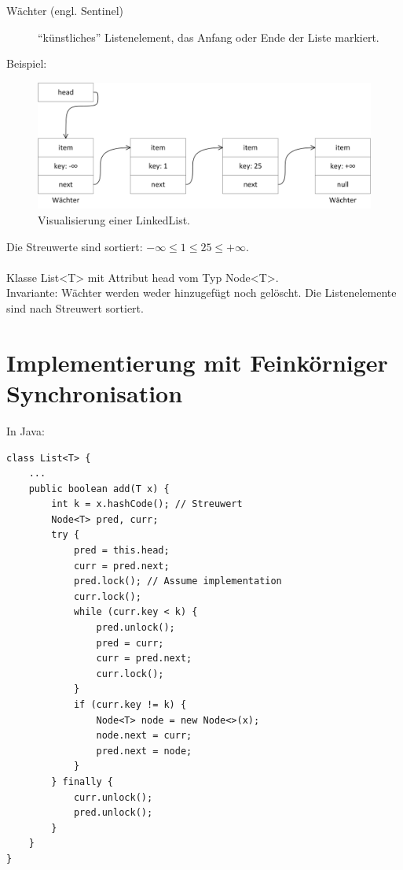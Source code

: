 \begin{description}
	\item[Wächter (engl. Sentinel)] "`künstliches"' Listenelement, das Anfang oder Ende der Liste markiert.
\end{description}

Beispiel:
\begin{figure}[H]
	\begin{center}
		\includegraphics[width=\textwidth]{res/linkedlist}
		\caption{Visualisierung einer LinkedList.}
		\label{pic:linkedlist}
	\end{center}
\end{figure} 
Die Streuwerte sind sortiert: $ -\infty \leq 1 \leq 25 \leq +\infty $.\\
\\
Klasse List<T> mit Attribut head vom Typ Node<T>.\\
Invariante: Wächter werden weder hinzugefügt noch gelöscht. Die Listenelemente sind nach Streuwert sortiert.

\section{Implementierung mit Feinkörniger Synchronisation}
In Java:
\begin{lstlisting}
class List<T> {
	...
	public boolean add(T x) {
		int k = x.hashCode(); // Streuwert
		Node<T> pred, curr;
		try {
			pred = this.head;
			curr = pred.next;
			pred.lock(); // Assume implementation
			curr.lock();
			while (curr.key < k) {
				pred.unlock();
				pred = curr;
				curr = pred.next;
				curr.lock();
			}
			if (curr.key != k) {
				Node<T> node = new Node<>(x);
				node.next = curr;
				pred.next = node;
			}
		} finally {
			curr.unlock();
			pred.unlock();
		}
	}
}
\end{lstlisting}

